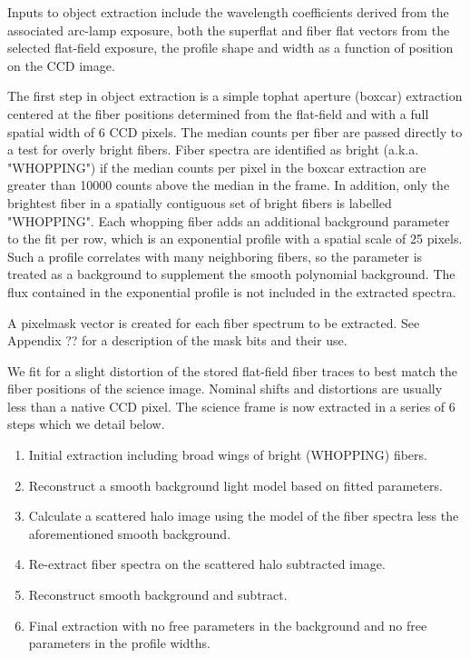 \documentclass[12pt,preprint]{aastex}
\begin{document}
Inputs to object extraction include the wavelength coefficients derived
from the associated arc-lamp exposure, both the superflat and fiber flat
vectors from the selected flat-field exposure, the profile shape and width
as a function of position on the CCD image.

The first step in object extraction is a simple tophat aperture (boxcar) 
extraction centered at the fiber positions determined from the flat-field 
and with a full spatial width of 6 CCD pixels.  The median counts per fiber 
are passed directly to a test for overly bright fibers. Fiber spectra are 
identified as bright (a.k.a. "WHOPPING") if the median counts per pixel in the 
boxcar extraction are greater than 10000 counts above the median in the 
frame.  In addition, only the brightest fiber in a spatially contiguous set of 
bright fibers is labelled "WHOPPING".  Each whopping fiber adds an additional
background parameter to the fit per row, which is an exponential profile
with a spatial scale of 25 pixels.  Such a profile correlates with many
neighboring fibers, so the parameter is treated as a background to supplement
the smooth polynomial background.  The flux contained in the exponential 
profile is not included in the extracted spectra.

A pixelmask vector is created for each fiber spectrum to be extracted.
See Appendix ?? for a description of the mask bits and their use.

We fit for a slight distortion of the stored flat-field fiber traces to 
best match the fiber positions of the science image.  Nominal shifts and
distortions are usually less than a native CCD pixel.  The science frame
is now extracted in a series of 6 steps which we detail below.

\begin{enumerate}
\item{Initial extraction including broad wings of bright (WHOPPING) fibers.}
\item{Reconstruct a smooth background light model based on fitted parameters.}
\item{Calculate a scattered halo image using the model of the fiber spectra less
the aforementioned smooth background.}
\item{Re-extract fiber spectra on the scattered halo subtracted image.}
\item{Reconstruct smooth background and subtract.}
\item{Final extraction with no free parameters in the background and
no free parameters in the profile widths.}
\end{enumerate}
\end{document}

